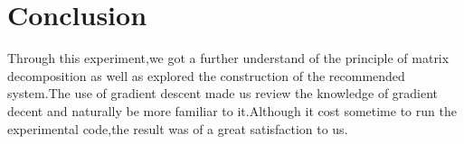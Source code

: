 \documentclass[journal, a4paper]{IEEEtran}
\begin{document}
\section{Conclusion}
Through this experiment,we got a further understand of the principle of matrix decomposition as well as explored the construction of the recommended system.The use of gradient descent made us review the knowledge of gradient decent and naturally be more familiar to it.Although it cost sometime to run the experimental code,the result was of a great satisfaction to us.
\end{document}
